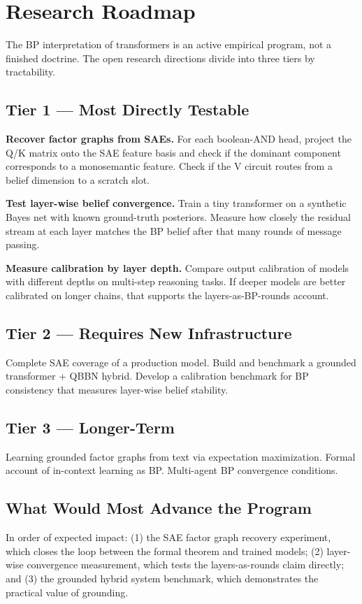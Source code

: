 \section{Research Roadmap}
\label{sec:roadmap}

The BP interpretation of transformers is an active empirical program, not
a finished doctrine. The open research directions divide into three tiers
by tractability.

\subsection*{Tier 1 --- Most Directly Testable}

\textbf{Recover factor graphs from SAEs.} For each boolean-AND head, project
the Q/K matrix onto the SAE feature basis and check if the dominant
component corresponds to a monosemantic feature. Check if the V circuit
routes from a belief dimension to a scratch slot.

\textbf{Test layer-wise belief convergence.} Train a tiny transformer on a
synthetic Bayes net with known ground-truth posteriors. Measure how closely
the residual stream at each layer matches the BP belief after that many
rounds of message passing.

\textbf{Measure calibration by layer depth.} Compare output calibration of
models with different depths on multi-step reasoning tasks. If deeper models
are better calibrated on longer chains, that supports the
layers-as-BP-rounds account.

\subsection*{Tier 2 --- Requires New Infrastructure}

Complete SAE coverage of a production model. Build and benchmark a grounded
transformer + QBBN hybrid. Develop a calibration benchmark for BP
consistency that measures layer-wise belief stability.

\subsection*{Tier 3 --- Longer-Term}

Learning grounded factor graphs from text via expectation maximization.
Formal account of in-context learning as BP. Multi-agent BP convergence
conditions.

\subsection*{What Would Most Advance the Program}

In order of expected impact: (1) the SAE factor graph recovery experiment,
which closes the loop between the formal theorem and trained models; (2)
layer-wise convergence measurement, which tests the layers-as-rounds claim
directly; and (3) the grounded hybrid system benchmark, which demonstrates
the practical value of grounding.